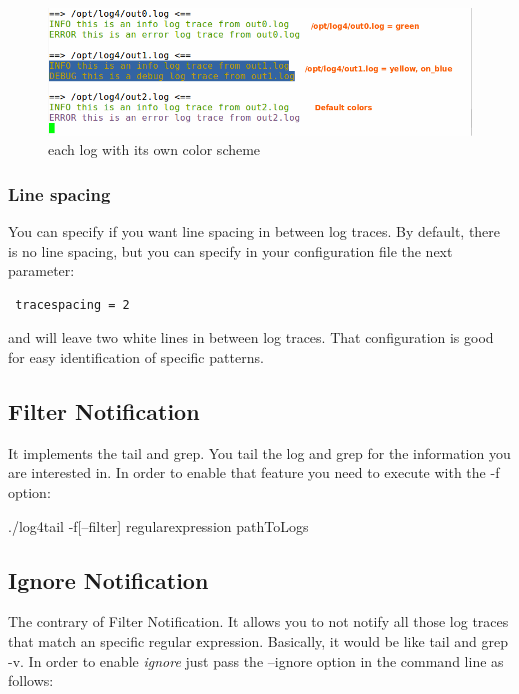 \begin{figure}[ht]
\centering
\includegraphics[scale=0.60]{multiple_colors.png}
\caption{\logftailer{} each log with its own color scheme}\label{fig:multiple_colors}
\end{figure}

\subsubsection{Line spacing}

You can specify if you want line spacing in between log traces. By default,
there is no line spacing, but you can specify in your configuration file the
next parameter:

\begin{config}
\begin{verbatim}
 tracespacing = 2
\end{verbatim}
\end{config}

and \logftailer{} will leave two white lines in between log traces. That
configuration is good for easy identification of specific patterns.

\subsection{Filter Notification}
\label{sec:filter}
It implements the tail and grep. You tail the log 
and grep for the information you are interested in. In order to enable that 
feature you need to execute \logftailer{} with the -f option:

\begin{cmd}
  ./log4tail -f[--filter] regularexpression pathToLogs
\end{cmd}

\subsection{Ignore Notification} %
\label{sec:ignore}
The contrary of Filter Notification\label{sec:filter}. It allows you to not
notify all those log traces that match an specific regular expression.
Basically, it would be like tail and grep -v. In order to enable \emph{ignore}
just pass the --ignore option in the command line as follows:

